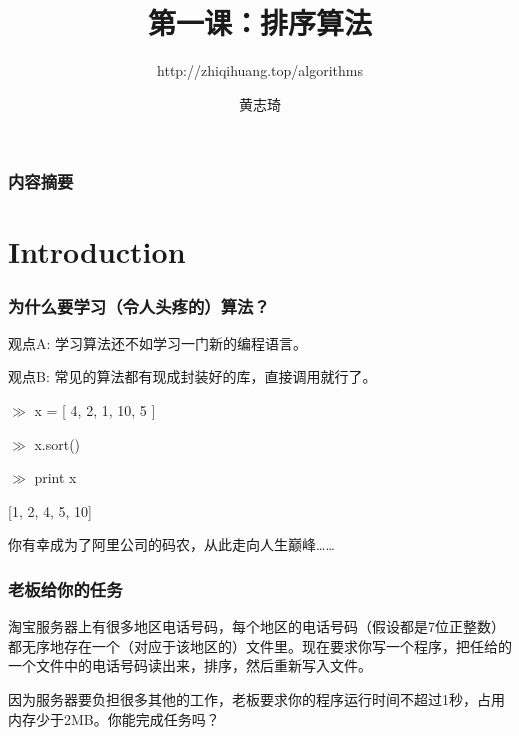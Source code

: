 \documentclass[CJK,14pt]{beamer}
\begin{document}
\bch

\title{第一课：排序算法}
\subtitle{http://zhiqihuang.top/algorithms}
  \author{黄志琦}
  \date{}

  \maketitle

  \begin{frame}
    \frametitle{内容摘要}
  \tableofcontents
  \end{frame}

  \section{Introduction}

  \begin{frame}
\frametitle{为什么要学习（令人头疼的）算法？}


    
  \end{frame}

  
  \begin{frame}
    \bitem
  \item{观点A: 学习算法还不如学习一门新的编程语言。}
    \eitem

  \end{frame}
  
  
  \begin{frame}
    \bitem
  \item{观点B: 常见的算法都有现成封装好的库，直接调用就行了。}
    \eitem

{\color{violet}
    $\gg$ x = [ 4, 2, 1, 10, 5 ]
    
    $\gg$ x.sort()
    
    $\gg$  print x

  [1, 2, 4, 5, 10]
}

    
  \end{frame}


  \begin{frame}
    你有幸成为了阿里公司的码农，从此走向人生巅峰……

  \end{frame}

  \begin{frame}
\frametitle{老板给你的任务}
    淘宝服务器上有很多地区电话号码，每个地区的电话号码（假设都是7位正整数）都无序地存在一个（对应于该地区的）文件里。现在要求你写一个程序，把任给的一个文件中的电话号码读出来，排序，然后重新写入文件。

    因为服务器要负担很多其他的工作，老板要求你的程序运行时间不超过1秒，占用内存少于2MB。你能完成任务吗？
    
  \end{frame}
\end{document}
